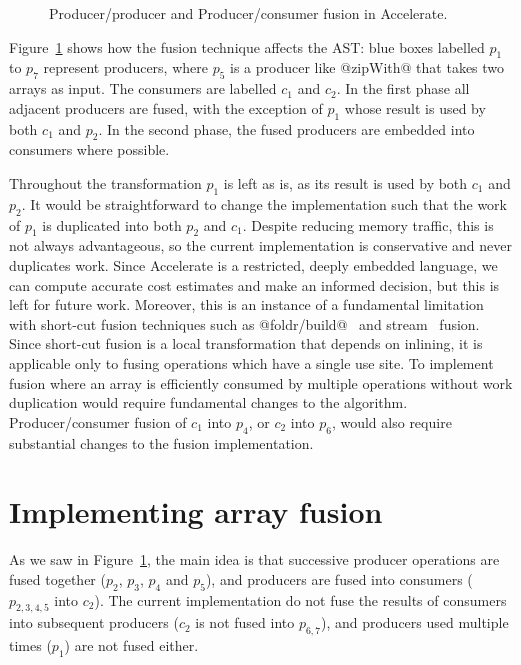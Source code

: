 \begin{figure}[htb]
    \caption[Fusion in Accelerate]{Producer/producer and Producer/consumer fusion in Accelerate.}
    \label{fig:fusion}
\end{figure}

Figure~\ref{fig:fusion} shows how the fusion technique affects the
AST: blue boxes labelled $p_1$ to $p_7$ represent
producers, where $p_5$ is a producer like @zipWith@ that takes two arrays
as input. The consumers are labelled $c_1$ and $c_2$. In the first phase all
adjacent producers are fused, with the exception of $p_1$ whose result is used
by both $c_1$ and $p_2$. In the second phase, the fused producers are embedded
into consumers where possible.

Throughout the transformation $p_1$ is left as is, as its result is used by both
$c_1$ and $p_2$. It would be straightforward to change the implementation such
that the work of $p_1$ is duplicated into both $p_2$ and $c_1$. Despite reducing
memory traffic, this is not always advantageous, so the current implementation
is conservative and never duplicates work. Since Accelerate is a restricted,
deeply embedded language, we can compute accurate cost estimates and make an
informed decision, but this is left for future work. Moreover, this is an
instance of a fundamental limitation with short-cut
fusion techniques such as
@foldr/build@~\cite{Gill:1993de} and
stream~\cite{Coutts:2007kp} fusion. Since short-cut fusion
is a local transformation that depends on inlining, it is applicable only to
fusing operations which have a single use site. To implement fusion where an
array is efficiently consumed by multiple operations without work duplication
would require fundamental changes to the algorithm.
%
Producer/consumer fusion of $c_1$ into $p_4$, or $c_2$ into $p_6$, would also
require substantial changes to the fusion implementation.


\section{Implementing array fusion}
\label{sec:implementing_array_fusion}

As we saw in Figure~\ref{fig:fusion}, the main idea is that successive producer
operations are fused together ($p_2$, $p_3$, $p_4$ and $p_5$), and producers are
fused into consumers ($p_{ 2,3,4,5 }$ into $ c_2$). The current implementation
do not fuse the results of consumers into subsequent producers ($c_2$ is not
fused into $p_{ 6,7 }$), and producers used multiple times ($p_1$) are not fused
either.

